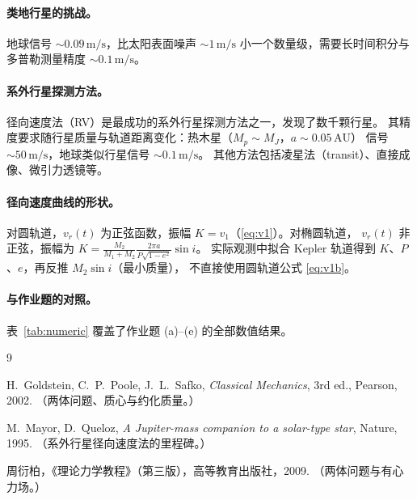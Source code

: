 \documentclass[UTF8,a4paper,11pt]{ctexart}
\begin{document}
\paragraph{类地行星的挑战。}
地球信号 $\sim0.09\,\mathrm{m/s}$，比太阳表面噪声 $\sim1\,\mathrm{m/s}$
小一个数量级，需要长时间积分与多普勒测量精度 $\sim0.1\,\mathrm{m/s}$。

\paragraph{系外行星探测方法。}
径向速度法（RV）是最成功的系外行星探测方法之一，发现了数千颗行星。
其精度要求随行星质量与轨道距离变化：热木星（$M_p\sim M_J$，$a\sim0.05\,\mathrm{AU}$）
信号 $\sim 50\,\mathrm{m/s}$，地球类似行星信号 $\sim 0.1\,\mathrm{m/s}$。
其他方法包括凌星法（transit）、直接成像、微引力透镜等。

\paragraph{径向速度曲线的形状。}
对圆轨道，$v_r(t)$ 为正弦函数，振幅 $K=v_1$（\eqref{eq:v1}）。对椭圆轨道，
$v_r(t)$ 非正弦，振幅为
$K=\frac{M_2}{M_1+M_2}\frac{2\pi a}{P\sqrt{1-e^2}}\sin i$。
实际观测中拟合 Kepler 轨道得到 $K$、$P$、$e$，再反推 $M_2\sin i$（最小质量），
不直接使用圆轨道公式 \eqref{eq:v1b}。
\paragraph{与作业题的对照。}
表~\ref{tab:numeric} 覆盖了作业题 (a)--(e) 的全部数值结果。

\begin{thebibliography}{9}

H.~Goldstein, C.~P.~Poole, J.~L.~Safko,
\emph{Classical Mechanics}, 3rd ed., Pearson, 2002.
（两体问题、质心与约化质量。）

M.~Mayor, D.~Queloz,
\emph{A Jupiter-mass companion to a solar-type star}, Nature, 1995.
（系外行星径向速度法的里程碑。）

周衍柏，《理论力学教程》（第三版），高等教育出版社，2009.
（两体问题与有心力场。）

\end{thebibliography}
\end{document}
